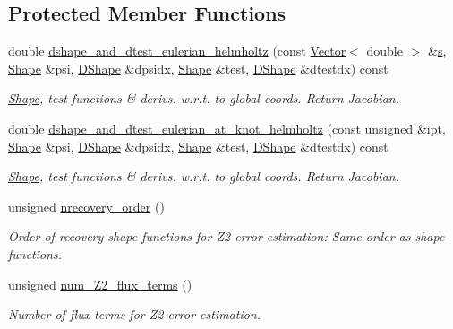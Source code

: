 \subsection*{Protected Member Functions}
\begin{DoxyCompactItemize}
\item 
double \hyperlink{classoomph_1_1THelmholtzElement_a885ded754f152323f82c83acb5b57887}{dshape\+\_\+and\+\_\+dtest\+\_\+eulerian\+\_\+helmholtz} (const \hyperlink{classoomph_1_1Vector}{Vector}$<$ double $>$ \&\hyperlink{cfortran_8h_ab7123126e4885ef647dd9c6e3807a21c}{s}, \hyperlink{classoomph_1_1Shape}{Shape} \&psi, \hyperlink{classoomph_1_1DShape}{D\+Shape} \&dpsidx, \hyperlink{classoomph_1_1Shape}{Shape} \&test, \hyperlink{classoomph_1_1DShape}{D\+Shape} \&dtestdx) const
\begin{DoxyCompactList}\small\item\em \hyperlink{classoomph_1_1Shape}{Shape}, test functions \& derivs. w.\+r.\+t. to global coords. Return Jacobian. \end{DoxyCompactList}\item 
double \hyperlink{classoomph_1_1THelmholtzElement_abe87fe860e1034b235df82f134a8c7f7}{dshape\+\_\+and\+\_\+dtest\+\_\+eulerian\+\_\+at\+\_\+knot\+\_\+helmholtz} (const unsigned \&ipt, \hyperlink{classoomph_1_1Shape}{Shape} \&psi, \hyperlink{classoomph_1_1DShape}{D\+Shape} \&dpsidx, \hyperlink{classoomph_1_1Shape}{Shape} \&test, \hyperlink{classoomph_1_1DShape}{D\+Shape} \&dtestdx) const
\begin{DoxyCompactList}\small\item\em \hyperlink{classoomph_1_1Shape}{Shape}, test functions \& derivs. w.\+r.\+t. to global coords. Return Jacobian. \end{DoxyCompactList}\item 
unsigned \hyperlink{classoomph_1_1THelmholtzElement_a8b5f6b37b1d0943c99daec3ebe65d3a4}{nrecovery\+\_\+order} ()
\begin{DoxyCompactList}\small\item\em Order of recovery shape functions for Z2 error estimation\+: Same order as shape functions. \end{DoxyCompactList}\item 
unsigned \hyperlink{classoomph_1_1THelmholtzElement_aebf54233a62ec5bea9666aeafce72647}{num\+\_\+\+Z2\+\_\+flux\+\_\+terms} ()
\begin{DoxyCompactList}\small\item\em Number of \textquotesingle{}flux\textquotesingle{} terms for Z2 error estimation. \end{DoxyCompactList}\item 

\end{DoxyCompactItemize}
